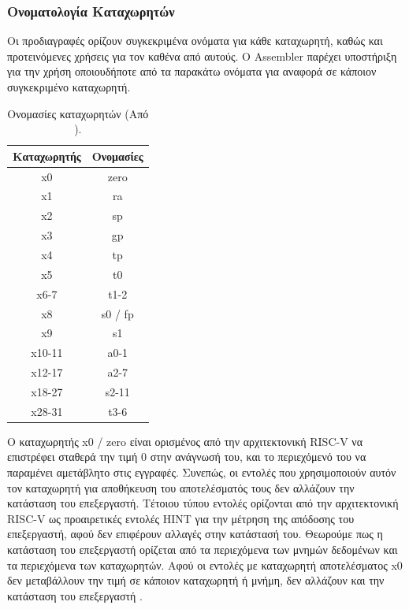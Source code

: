 \documentclass[11pt]{extarticle}
\begin{document}
\subsubsection{Ονοματολογία Καταχωρητών}
Οι προδιαγραφές ορίζουν συγκεκριμένα ονόματα για κάθε καταχωρητή, καθώς και προτεινόμενες χρήσεις για τον καθένα από αυτούς\footnotemark.
Ο Assembler παρέχει υποστήριξη για την χρήση οποιουδήποτε από τα παρακάτω ονόματα για αναφορά σε κάποιον συγκεκριμένο καταχωρητή.
\begin{table}[H]
\centering
\begin{tabular}{|c|c|}
\hline
\cellcolor{lgray} \textbf{Καταχωρητής} & \cellcolor{lgray} \textbf{Ονομασίες} \\\hline
x0     & zero    \\\hline
x1     & ra      \\\hline
x2     & sp      \\\hline
x3     & gp      \\\hline
x4     & tp      \\\hline
x5     & t0      \\\hline
x6-7   & t1-2    \\\hline
x8     & s0 / fp \\\hline
x9     & s1      \\\hline
x10-11 & a0-1    \\\hline
x12-17 & a2-7    \\\hline
x18-27 & s2-11   \\\hline
x28-31 & t3-6    \\\hline
\end{tabular}
\caption[Ονομασίες Καταχωρητών]{\label{tab:widgets}Ονομασίες καταχωρητών (Από \cite{spec}).}
\end{table}
Ο καταχωρητής x0 / zero είναι ορισμένος από την αρχιτεκτονική RISC-V να επιστρέφει σταθερά την τιμή 0 στην ανάγνωσή του, και το περιεχόμενό του να παραμένει αμετάβλητο στις εγγραφές.
Συνεπώς, οι εντολές που χρησιμοποιούν αυτόν τον καταχωρητή για αποθήκευση του αποτελέσματός τους δεν αλλάζουν την κατάσταση του επεξεργαστή.
Τέτοιου τύπου εντολές ορίζονται από την αρχιτεκτονική RISC-V ως προαιρετικές εντολές HINT για την μέτρηση της απόδοσης του επεξεργαστή, αφού δεν επιφέρουν αλλαγές στην κατάστασή του.
Θεωρούμε πως η κατάσταση του επεξεργαστή ορίζεται από τα περιεχόμενα των μνημών δεδομένων και τα περιεχόμενα των καταχωρητών.
Αφού οι εντολές με καταχωρητή αποτελέσματος x0 δεν μεταβάλλουν την τιμή σε κάποιον καταχωρητή ή μνήμη, δεν αλλάζουν και την κατάσταση του επεξεργαστή \cite{spec}.
\end{document}
